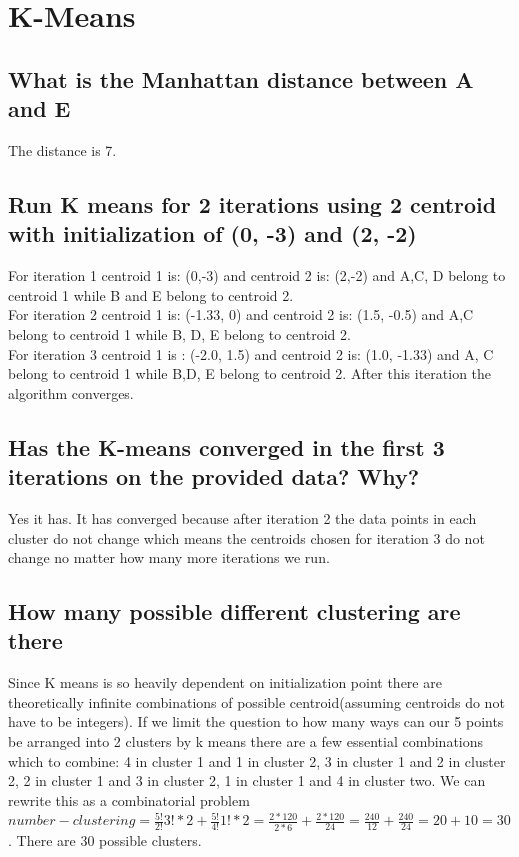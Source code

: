 \documentclass[11pt]{article}
\begin{document}
\section{K-Means}
\subsection{What is the Manhattan distance between A and E}
The distance is 7.
\subsection{Run K means for 2 iterations using 2 centroid with initialization of (0, -3) and (2, -2)}
For iteration 1 centroid 1 is: (0,-3) and centroid 2 is: (2,-2) and A,C, D belong to centroid 1 while B and E belong to centroid 2. \\
For iteration 2 centroid 1 is: (-1.33, 0) and centroid 2 is: (1.5, -0.5) and A,C belong to centroid 1 while B, D, E belong to centroid 2. \\
For iteration 3 centroid 1 is : (-2.0, 1.5) and centroid 2 is: (1.0, -1.33) and A, C belong to centroid 1 while B,D, E belong to centroid 2. After this iteration the algorithm converges. 
\subsection{Has the K-means converged in the first 3 iterations on the provided data? Why? }
Yes it has. It has converged because after iteration 2 the data points in each cluster do not change which means the centroids chosen for iteration 3 do not change no matter how many more iterations we run. 
\subsection{How many possible different clustering are there}
Since K means is so heavily dependent on initialization point there are theoretically infinite combinations of possible centroid(assuming centroids do not have to be integers). If we limit the question to how many ways can our 5 points be arranged into 2 clusters by k means there are a few essential combinations which to combine: 4 in cluster 1 and 1 in cluster 2, 3 in cluster 1 and 2 in cluster 2, 2 in cluster 1 and 3 in cluster 2, 1 in cluster 1 and 4 in cluster two. We can rewrite this as a combinatorial problem $number-clustering=\frac{5!}{2!}{3!}*2+\frac{5!}{4!}{1!}*2= \frac{2*120}{2*6} + \frac{2*120}{24}= \frac{240}{12} + \frac{240}{24} = 20 + 10 = 30$. There are 30 possible clusters.
\end{document}

